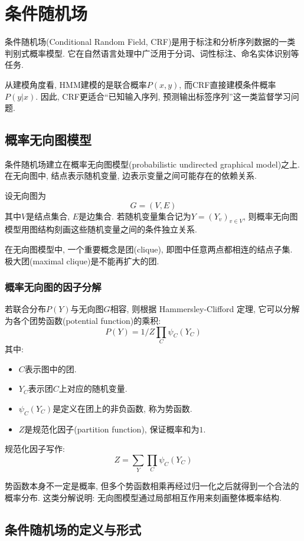 \chapter{条件随机场}


条件随机场(Conditional Random Field, CRF)是用于标注和分析序列数据的一类判别式概率模型.
它在自然语言处理中广泛用于分词、词性标注、命名实体识别等任务.

从建模角度看, HMM建模的是联合概率$P(x, y)$, 而CRF直接建模条件概率$P(y|x)$.
因此, CRF更适合“已知输入序列, 预测输出标签序列”这一类监督学习问题.

\section{概率无向图模型}


条件随机场建立在概率无向图模型(probabilistic undirected graphical model)之上.
在无向图中, 结点表示随机变量, 边表示变量之间可能存在的依赖关系.

设无向图为
\[
G = (V, E)
\]
其中$V$是结点集合, $E$是边集合.
若随机变量集合记为$Y = (Y_v)_{v \in V}$, 则概率无向图模型用图结构刻画这些随机变量之间的条件独立关系.

在无向图模型中, 一个重要概念是团(clique), 即图中任意两点都相连的结点子集.
极大团(maximal clique)是不能再扩大的团.

\subsection{概率无向图的因子分解}


若联合分布$P(Y)$与无向图$G$相容, 则根据 Hammersley-Clifford 定理, 它可以分解为各个团势函数(potential function)的乘积:
\[
P(Y) = 1/Z \prod_C \psi_C (Y_C)
\]
其中:

\begin{itemize}
\item $C$表示图中的团.
\item $Y_C$表示团$C$上对应的随机变量.
\item $\psi_C(Y_C)$是定义在团上的非负函数, 称为势函数.
\item $Z$是规范化因子(partition function), 保证概率和为$1$.
\end{itemize}

规范化因子写作:
\[
Z = \sum_Y \prod_C \psi_C (Y_C)
\]

势函数本身不一定是概率, 但多个势函数相乘再经过归一化之后就得到一个合法的概率分布.
这类分解说明: 无向图模型通过局部相互作用来刻画整体概率结构.

\section{条件随机场的定义与形式}



